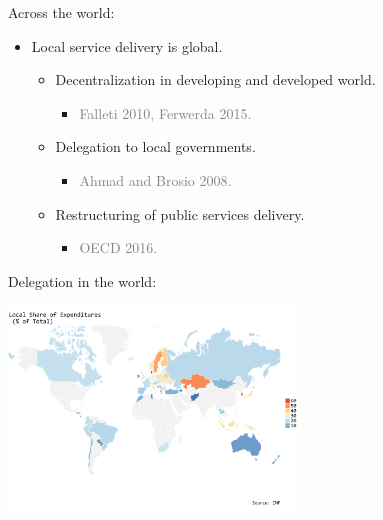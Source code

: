 \documentclass[ignorenonframetext,]{beamer}
\providecommand{\tightlist}{%
  \setlength{\itemsep}{0pt}\setlength{\parskip}{0pt}}
\begin{document}
\begin{frame}{Across the world:}

\begin{itemize}[<+->]
\tightlist
\item
  Local service delivery is global.

  \begin{itemize}[<+->]
  \tightlist
  \item
    Decentralization in developing and developed world.

    \begin{itemize}[<+->]
    \tightlist
    \item
      \textcolor{gray}{Falleti 2010, Ferwerda 2015.}
    \end{itemize}
  \item
    Delegation to local governments.

    \begin{itemize}[<+->]
    \tightlist
    \item
      \textcolor{gray}{Ahmad and Brosio 2008.}
    \end{itemize}
  \item
    Restructuring of public services delivery.

    \begin{itemize}[<+->]
    \tightlist
    \item
      \textcolor{gray}{OECD 2016.}
    \end{itemize}
  \end{itemize}
\end{itemize}

\end{frame}

\begin{frame}{Delegation in the world:}

\begin{center}\includegraphics[width=290px]{map_share} \end{center}

\end{frame}
\end{document}
